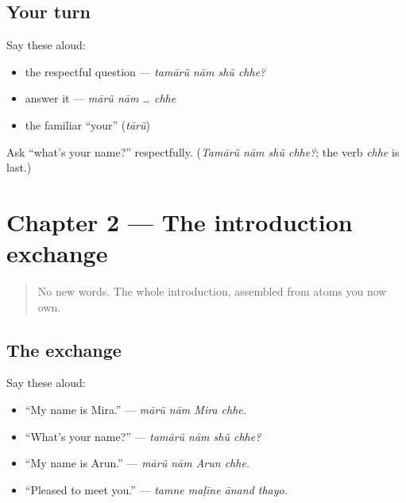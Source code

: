 \subsection*{Your turn}
Say these aloud:

\begin{itemize}
\raggedright
  \item the respectful question — \emph{tamārũ nām shũ chhe?}
  \item answer it — \emph{mārũ nām … chhe}
  \item the familiar \textquotedblleft{}your\textquotedblright{} (\emph{tārũ})
\end{itemize}

\begin{tcolorbox}[breakable,colback=teal!4,colframe=teal!35!black,title={Before you move on}]
Ask \textquotedblleft{}what's your name?\textquotedblright{} respectfully. (\emph{Tamārũ nām shũ chhe?}; the verb \emph{chhe} is last.)
\end{tcolorbox}
\section[Practice]{Chapter 2 — The introduction exchange}

\label{lesson:GU-C02-practice}



\begin{quote}
No new words. The whole introduction, assembled from atoms you now own.
\end{quote}

\subsection*{The exchange}
Say these aloud:

\begin{itemize}
\raggedright
  \item \textquotedblleft{}My name is Mira.\textquotedblright{} — \emph{mārũ nām Mira chhe.}
  \item \textquotedblleft{}What's your name?\textquotedblright{} — \emph{tamārũ nām shũ chhe?}
  \item \textquotedblleft{}My name is Arun.\textquotedblright{} — \emph{mārũ nām Arun chhe.}
  \item \textquotedblleft{}Pleased to meet you.\textquotedblright{} — \emph{tamne maḷīne ānand thayo.}
\end{itemize}

